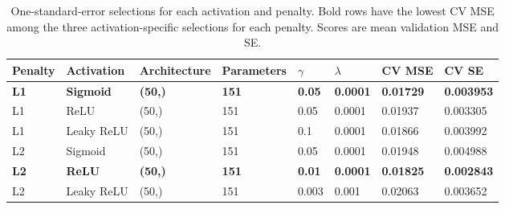\begin{table}[t]
    \centering
    \caption{One-standard-error selections for each activation and penalty. Bold rows have the lowest CV MSE among the three activation-specific selections for each penalty. Scores are mean validation MSE and SE.}
    \label{tab:part_d_selected_models}
    \begin{tabular}{llllllll}
        \hline\hline
        Penalty     & Activation       & Architecture   & Parameters   & $\gamma$      & $\lambda$       & CV MSE           & CV SE             \\
        \hline
        \textbf{L1} & \textbf{Sigmoid} & \textbf{(50,)} & \textbf{151} & \textbf{0.05} & \textbf{0.0001} & \textbf{0.01729} & \textbf{0.003953} \\
        L1          & ReLU             & (50,)          & 151          & 0.05          & 0.0001          & 0.01937          & 0.003305          \\
        L1          & Leaky ReLU       & (50,)          & 151          & 0.1           & 0.0001          & 0.01866          & 0.003992          \\
        L2          & Sigmoid          & (50,)          & 151          & 0.05          & 0.0001          & 0.01948          & 0.004988          \\
        \textbf{L2} & \textbf{ReLU}    & \textbf{(50,)} & \textbf{151} & \textbf{0.01} & \textbf{0.0001} & \textbf{0.01825} & \textbf{0.002843} \\
        L2          & Leaky ReLU       & (50,)          & 151          & 0.003         & 0.001           & 0.02063          & 0.003652          \\
        \hline\hline
    \end{tabular}
\end{table}
